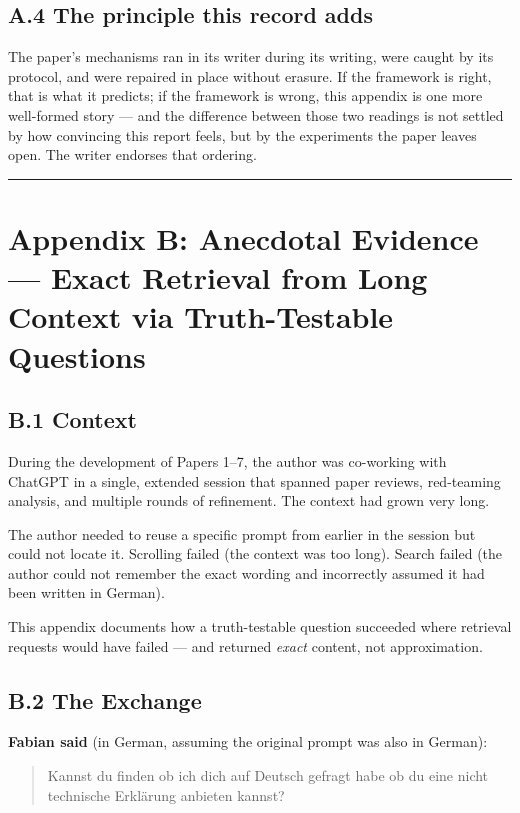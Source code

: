 \subsection*{A.4 The principle this record adds}

The paper's mechanisms ran in its writer during its writing, were caught by
its protocol, and were repaired in place without erasure. If the framework is
right, that is what it predicts; if the framework is wrong, this appendix is
one more well-formed story --- and the difference between those two readings
is not settled by how convincing this report feels, but by the experiments the
paper leaves open. The writer endorses that ordering.

\medskip\hrule\medskip

\section*{Appendix B: Anecdotal Evidence --- Exact Retrieval from Long Context via Truth-Testable Questions}

\subsection*{B.1 Context}

During the development of Papers 1--7, the author was co-working with ChatGPT in a single, extended session that spanned paper reviews, red-teaming analysis, and multiple rounds of refinement. The context had grown very long.

The author needed to reuse a specific prompt from earlier in the session but could not locate it. Scrolling failed (the context was too long). Search failed (the author could not remember the exact wording and incorrectly assumed it had been written in German).

This appendix documents how a truth-testable question succeeded where retrieval requests would have failed --- and returned \emph{exact} content, not approximation.

\subsection*{B.2 The Exchange}

\textbf{Fabian said} (in German, assuming the original prompt was also in German):

\begin{quote}Kannst du finden ob ich dich auf Deutsch gefragt habe ob du eine nicht technische Erklärung anbieten kannst?\end{quote}

